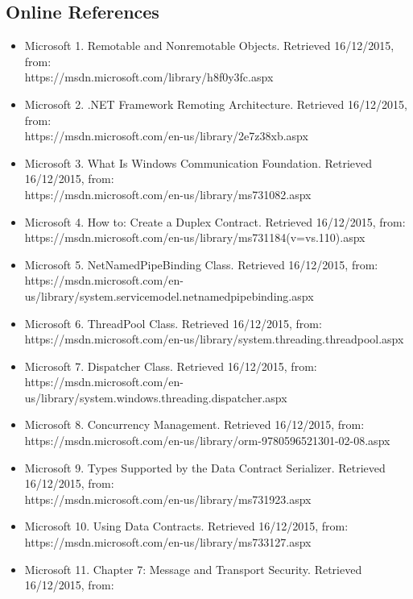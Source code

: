 \subsection {Online References}
\begin{itemize}
	\item Microsoft 1. Remotable and Nonremotable Objects. Retrieved 16/12/2015, from:
	\\
	 https://msdn.microsoft.com/library/h8f0y3fc.aspx
	\item Microsoft 2. .NET Framework Remoting Architecture. Retrieved 16/12/2015, from:
	\\
	 https://msdn.microsoft.com/en-us/library/2e7z38xb.aspx
	\item Microsoft 3. What Is Windows Communication Foundation. Retrieved 16/12/2015, from:
	\\
	 https://msdn.microsoft.com/en-us/library/ms731082.aspx
	\item Microsoft 4. How to: Create a Duplex Contract. Retrieved 16/12/2015, from:
	\\
	 https://msdn.microsoft.com/en-us/library/ms731184(v=vs.110).aspx
	\item Microsoft 5. NetNamedPipeBinding Class. Retrieved 16/12/2015, from: 
	\\
	 https://msdn.microsoft.com/en-us/library/system.servicemodel.netnamedpipebinding.aspx
	\item Microsoft 6. ThreadPool Class. Retrieved 16/12/2015, from: 
	\\
	 https://msdn.microsoft.com/en-us/library/system.threading.threadpool.aspx
	\item Microsoft 7. Dispatcher Class. Retrieved 16/12/2015, from:
	\\
	 https://msdn.microsoft.com/en-us/library/system.windows.threading.dispatcher.aspx
	\item Microsoft 8. Concurrency Management. Retrieved 16/12/2015, from:
	\\
	 https://msdn.microsoft.com/en-us/library/orm-9780596521301-02-08.aspx
	\item Microsoft 9. Types Supported by the Data Contract Serializer. Retrieved 16/12/2015, from:
	\\
	 https://msdn.microsoft.com/en-us/library/ms731923.aspx
	\item Microsoft 10. Using Data Contracts. Retrieved 16/12/2015, from:
	\\
	 https://msdn.microsoft.com/en-us/library/ms733127.aspx
	\item Microsoft 11. Chapter 7: Message and Transport Security. Retrieved 16/12/2015, from:

\end{itemize}
